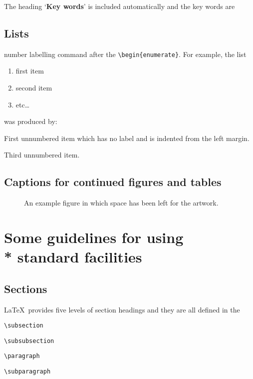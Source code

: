The heading `\textbf{Key words}' is included automatically and the key words are

\subsection{Lists}

number labelling command after the \verb"\begin{enumerate}". For example, the
list
\begin{enumerate}
\renewcommand{\theenumi}{(\arabic{enumi})}
  \item first item
  \item second item
  \item etc\ldots
\end{enumerate}
was produced by:
\begin{description}
  \item First unnumbered item which has no label and is indented from the left
        margin.
  \item Third unnumbered item.
\end{description}

\subsection{Captions for continued figures and tables}

 \begin{figure}
     \vspace{5.5cm}
     \caption{An example figure in which space has been left for the artwork.}\label{sample-figure}
  \end{figure}

\section[]{Some guidelines for using\\* standard facilities}

\subsection{Sections}

\LaTeX\ provides five levels of section headings and they are all defined in the
\begin{description}
  \item \verb"\subsection"
  \item \verb"\subsubsection"
  \item \verb"\paragraph"
  \item \verb"\subparagraph"
\end{description}

